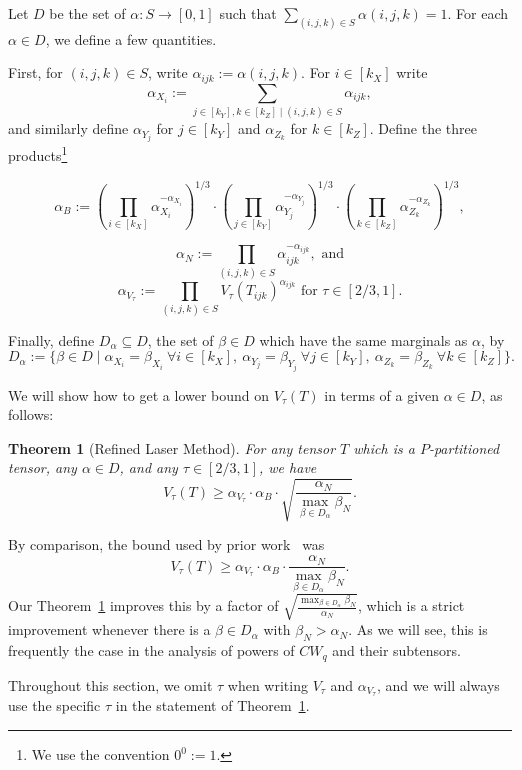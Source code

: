 \PassOptionsToPackage{shortlabels}{enumitem}\documentclass[10pt,a4paper]{article}
\newtheorem{theorem}{Theorem}[section]
\begin{document}
Let $D$ be the set of $\alpha : S \to [0,1]$  such that $\sum_{(i,j,k) \in S} \alpha(i,j,k) = 1$. For each $\alpha\in D$, we define a few quantities. 

First, for $(i,j,k) \in S$, write $\alpha_{ijk} := \alpha(i,j,k)$. 
For $i \in [k_X]$ write $$\alpha_{X_i} := \sum_{j \in [k_Y], k \in [k_Z] \mid (i,j,k) \in S} \alpha_{ijk},$$ and similarly define $\alpha_{Y_j}$ for $j \in [k_Y]$ and $\alpha_{Z_k}$ for $k \in [k_Z]$. Define the three products\footnote{We use the convention $0^0 := 1$.}

$$\alpha_B := \left( \prod_{i \in [k_X]} \alpha_{X_i}^{-\alpha_{X_i}} \right)^{1/3} \cdot \left( \prod_{j \in [k_Y]} \alpha_{Y_j}^{-\alpha_{Y_j}} \right)^{1/3} \cdot \left( \prod_{k \in [k_Z]} \alpha_{Z_k}^{-\alpha_{Z_k}} \right)^{1/3},$$

$$\alpha_N := \prod_{(i,j,k) \in S} \alpha_{ijk}^{-\alpha_{ijk}} , \text{ and}$$
$$\alpha_{V_\tau} := \prod_{(i,j,k) \in S} V_\tau(T_{ijk})^{\alpha_{ijk}} \text{ for } \tau \in [2/3,1].$$

Finally, define $D_\alpha \subseteq D$, the set of $\beta \in D$ which have the same marginals as $\alpha$, by $$D_\alpha := \{ \beta \in D \mid \alpha_{X_i}=\beta_{X_i} ~\forall i \in [k_X],~ \alpha_{Y_j}=\beta_{Y_j} ~\forall j\in [k_Y],~ \alpha_{Z_k}=\beta_{Z_k} ~\forall k \in [k_Z] \}.$$

We will show how to get a lower bound on $V_\tau(T)$ in terms of a given $\alpha \in D$, as follows:

\begin{theorem}[Refined Laser Method] \label{thm:main}
For any tensor $T$ which is a $P$-partitioned tensor, any $\alpha \in D$, and any $\tau \in [2/3,1]$, we have
$$V_\tau(T) \geq \alpha_{V_\tau} \cdot \alpha_B \cdot \sqrt{\frac{\alpha_N}{\max_{\beta \in D_\alpha} \beta_N}}.$$
\end{theorem}


By comparison, the bound used by prior work~\cite{v12,legall} was 
$$V_\tau(T) \geq \alpha_{V_\tau} \cdot \alpha_B \cdot \frac{\alpha_N}{\max_{\beta \in D_\alpha} \beta_N}.$$ Our Theorem~\ref{thm:main} improves this by a factor of $\sqrt{\frac{\max_{\beta \in D_\alpha} \beta_N}{\alpha_N}}$, which is a strict improvement whenever there is a $\beta \in D_\alpha$ with $\beta_N > \alpha_N$. As we will see, this is frequently the case in the analysis of powers of $CW_q$ and their subtensors.

Throughout this section, we omit $\tau$ when writing $V_\tau$ and $\alpha_{V_\tau}$, and we will always use the specific $\tau$ in the statement of Theorem~\ref{thm:main}.
\end{document}
